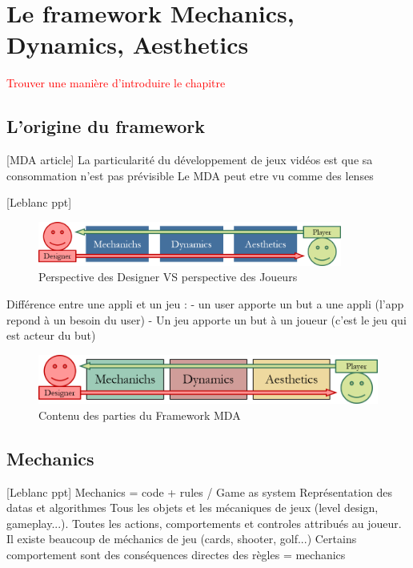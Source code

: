 \chapter{Le framework Mechanics, Dynamics, Aesthetics}

\textcolor{red}{Trouver une manière d'introduire le chapitre}

\section{L'origine du framework}
[MDA article]
La particularité du développement de jeux vidéos est que sa consommation n'est pas prévisible
Le MDA peut etre vu comme des lenses

[Leblanc ppt]
\begin{figure}[H]
    \centering
    \includegraphics[width=10cm]{10_img/chap3/desvspla.png} 
    \caption{Perspective des Designer VS perspective des Joueurs \cite{MDA_formal}}
\end{figure}
Différence entre une appli et un jeu : 
- un user apporte un but a une appli (l'app repond à un besoin du user)
- Un jeu apporte un but à un joueur (c'est le jeu qui est acteur du but)

\begin{figure}[H]
    \centering
    \includegraphics[width=14cm]{10_img/chap3/mda.png} 
    \caption{Contenu des parties du Framework MDA \cite{MDA_formal}}
\end{figure}


\section{Mechanics}
[Leblanc ppt] Mechanics = code + rules / Game as system
Représentation des datas et algorithmes
Tous les objets et les mécaniques de jeux (level design, gameplay...).
Toutes les actions, comportements et controles attribués au joueur.
Il existe beaucoup de méchanics de jeu (cards, shooter, golf...)
Certains comportement sont des conséquences directes des règles = mechanics



